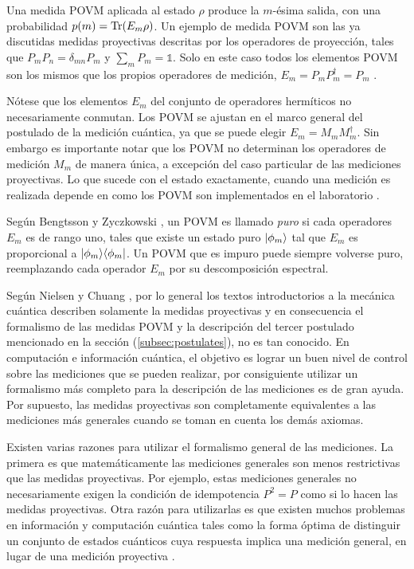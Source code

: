 Una medida POVM aplicada al estado $\rho$ produce la $m$-ésima salida, con una
probabilidad $p(m)={\rm Tr}(E_m \rho)$. Un ejemplo de medida POVM son las ya
discutidas medidas proyectivas descritas por los operadores de proyección,
tales que $P_m P_n=\delta_{mn}P_{m}$ y $\sum_m P_m = \mathds{1}$. Solo en este
caso todos los elementos POVM son los mismos que los propios operadores de
medición, $E_m=P_m P_m^\dagger=P_m$ {\cite{nielsen_chuang_2010}}.


Nótese que los elementos $E_m$ del conjunto de operadores hermíticos no
necesariamente conmutan. Los POVM se ajustan en el marco general del postulado
de la medición cuántica, ya que se puede elegir $E_m=M_m M_m^{\dagger}$. Sin
embargo es importante notar que los POVM no determinan los operadores de
medición $M_m$ de manera única, a excepción del caso particular de las
mediciones proyectivas. Lo que sucede con el estado exactamente, cuando una
medición es realizada depende en como los POVM son implementados en el
laboratorio {\cite{2007geometry}}.   

Según Bengtsson y Zyczkowski {\cite{2007geometry}}, un POVM es llamado
\textit{puro} si cada operadores $E_m$ es de rango uno, tales que existe un
estado puro $|\phi_m\rangle$ tal que $E_m$ es proporcional a $|\phi_m\rangle \langle\phi_m|$.
Un POVM que es impuro puede siempre volverse puro, reemplazando
cada operador $E_m$ por su descomposición espectral. 


Según Nielsen y Chuang {\cite{nielsen_chuang_2010}}, por lo general los textos
introductorios a la mecánica cuántica describen solamente la medidas
proyectivas y en consecuencia el formalismo de las medidas POVM y la
descripción del tercer postulado mencionado en la sección ({\ref{subsec:postulates}}),
no es tan conocido. En computación e información cuántica, el objetivo es
lograr un buen nivel de control sobre las mediciones que se pueden realizar,
por consiguiente utilizar un formalismo más completo para la descripción de las
mediciones es de gran ayuda. Por supuesto, las medidas proyectivas son
completamente equivalentes a las mediciones más generales cuando se toman en
cuenta los demás axiomas.


Existen varias razones para utilizar el formalismo general de las mediciones. La primera es que matemáticamente las mediciones generales son menos restrictivas que las medidas proyectivas. Por ejemplo, estas mediciones generales no necesariamente exigen la condición de idempotencia $P^2=P$ como si lo hacen las medidas proyectivas. Otra razón para utilizarlas es que existen muchos problemas en información y computación cuántica tales como la forma óptima de distinguir un conjunto de estados cuánticos cuya respuesta implica una medición general, en lugar de una medición proyectiva {\cite{nielsen_chuang_2010}}.


